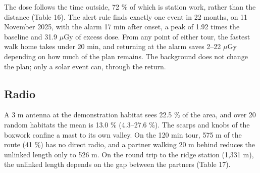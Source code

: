\documentclass[11pt,a4paper]{article}
\begin{document}
\begin{table}[H]
\centering\small
\caption{Dose of the station tours at the background rate.}
\end{table}

The dose follows the time outside, 72 \% of which is station work, rather than the distance (Table 16). The alert rule finds exactly one event in 22 months, on 11 November 2025, with the alarm 17 min after onset, a peak of 1.92 times the baseline and 31.9 $\mu$Gy of excess dose. From any point of either tour, the fastest walk home takes under 20 min, and returning at the alarm saves 2--22 $\mu$Gy depending on how much of the plan remains. The background does not change the plan; only a solar event can, through the return.

\subsection{Radio}

A 3 m antenna at the demonstration habitat sees 22.5 \% of the area, and over 20 random habitats the mean is 13.0 \% (4.3--27.6 \%). The scarps and knobs of the boxwork confine a mast to its own valley. On the 120 min tour, 575 m of the route (41 \%) has no direct radio, and a partner walking 20 m behind reduces the unlinked length only to 526 m. On the round trip to the ridge station (1,331 m), the unlinked length depends on the gap between the partners (Table 17).

\begin{table}[H]
\centering\small
\caption{Route length with no link against the gap between the partners, round trip to the ridge station.}
\end{table}
\end{document}
